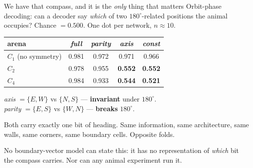 \documentclass[9pt,aspectratio=169]{beamer}
\begin{document}
\begin{frame}{We have that compass, and it is the \emph{only} thing that matters}
\vspace{4pt}
Orbit-phase decoding: can a decoder say \emph{which} of two $180^\circ$-related positions the animal
occupies? Chance $=0.500$. One dot per network, $n \approx 10$.

\vspace{8pt}
\centering
\begin{tabular}{lcccc}
\toprule
arena & \textit{full} & \textit{parity} & \textit{axis} & \textit{const} \\
\midrule
$C_1$ (no symmetry) & 0.981 & 0.972 & 0.971 & 0.966 \\
$C_2$               & 0.978 & 0.955 & \textbf{0.552} & \textbf{0.552} \\
$C_4$               & 0.984 & 0.933 & \textbf{0.544} & \textbf{0.521} \\
\bottomrule
\end{tabular}

\vspace{12pt}
\raggedright
\textit{axis} $=\{E,W\}$ vs $\{N,S\}$ --- \textbf{invariant} under $180^\circ$.\\
\textit{parity} $=\{E,S\}$ vs $\{W,N\}$ --- \textbf{breaks} $180^\circ$.

\vspace{6pt}
\alert{Both carry exactly one bit of heading.} Same information, same architecture, same walls, same
corners, same boundary cells. Opposite folds.

\vspace{6pt}
No boundary-vector model can state this: it has no representation of \emph{which} bit the compass
carries. Nor can any animal experiment run it.
\end{frame}
\end{document}
